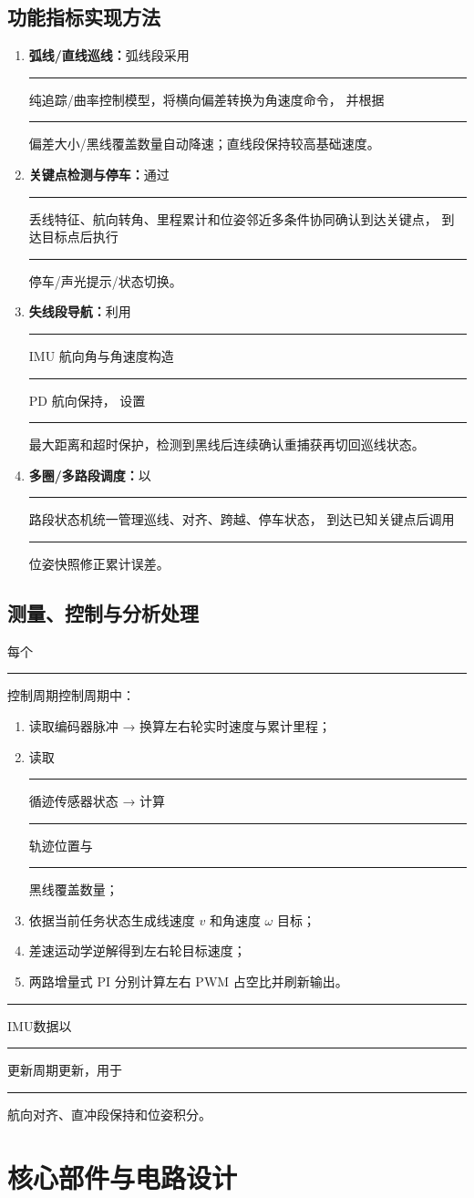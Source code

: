 \documentclass[12pt,a4paper,fontset=fandol]{ctexart}
\newcommand{\blank}{\rule{4cm}{0.4pt}}   %
\begin{document}
\subsection{功能指标实现方法}
\begin{enumerate}
  \item \textbf{弧线/直线巡线：}弧线段采用\blank{纯追踪/曲率控制}模型，将横向偏差转换为角速度命令，
  并根据\blank{偏差大小/黑线覆盖数量}自动降速；直线段保持较高基础速度。
  \item \textbf{关键点检测与停车：}通过\blank{丢线特征、航向转角、里程累计和位姿邻近}多条件协同确认到达关键点，
  到达目标点后执行\blank{停车/声光提示/状态切换}。
  \item \textbf{失线段导航：}利用\blank{IMU 航向角与角速度}构造\blank{PD 航向保持}，
  设置\blank{最大距离和超时保护}，检测到黑线后连续确认重捕获再切回巡线状态。
  \item \textbf{多圈/多路段调度：}以\blank{路段状态机}统一管理巡线、对齐、跨越、停车状态，
  到达已知关键点后调用\blank{位姿快照}修正累计误差。
\end{enumerate}

\subsection{测量、控制与分析处理}
每个\blank{控制周期}控制周期中：
\begin{enumerate}
  \item 读取编码器脉冲 → 换算左右轮实时速度与累计里程；
  \item 读取\blank{循迹传感器}状态 → 计算\blank{轨迹位置}与\blank{黑线覆盖数量}；
  \item 依据当前任务状态生成线速度 $v$ 和角速度 $\omega$ 目标；
  \item 差速运动学逆解得到左右轮目标速度；
  \item 两路增量式 PI 分别计算左右 PWM 占空比并刷新输出。
\end{enumerate}
\blank{IMU}数据以\blank{更新周期}更新，用于\blank{航向对齐、直冲段保持和位姿积分}。

\section{核心部件与电路设计}
\end{document}
